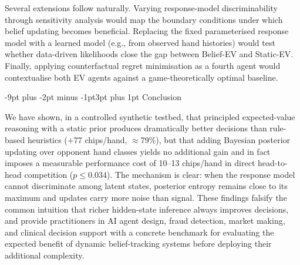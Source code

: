 \documentclass[12pt]{article}
\makeatletter
\renewcommand\section{\@startsection{section}{1}{\z@}%
  {-9pt plus -2pt minus -1pt}{3pt plus 1pt}%
  {\normalfont\large\bfseries}}
\makeatother
\begin{document}
Several extensions follow naturally.
Varying response-model discriminability through sensitivity
analysis would map the boundary conditions under which belief
updating becomes beneficial.
Replacing the fixed parameterised response model with a learned
model (e.g., from observed hand histories) would test whether
data-driven likelihoods close the gap between Belief-EV and
Static-EV.
Finally, applying counterfactual regret minimisation\cite{zinkevich2007cfr}
as a fourth agent would contextualise both EV agents against
a game-theoretically optimal baseline.

\section{Conclusion}

We have shown, in a controlled synthetic testbed, that principled
expected-value reasoning with a static prior produces dramatically
better decisions than rule-based heuristics ($+$77 chips/hand,
$\approx$79\%), but that adding Bayesian posterior updating over
opponent hand classes yields no additional gain and in fact imposes
a measurable performance cost of 10--13 chips/hand in direct
head-to-head competition ($p \leq 0.034$).
The mechanism is clear: when the response model cannot
discriminate among latent states, posterior entropy remains close
to its maximum and updates carry more noise than signal.
These findings falsify the common intuition that richer hidden-state
inference always improves decisions, and provide practitioners in
AI agent design, fraud detection, market making, and clinical
decision support with a concrete benchmark for evaluating the
expected benefit of dynamic belief-tracking systems before deploying
their additional complexity.
\end{document}
